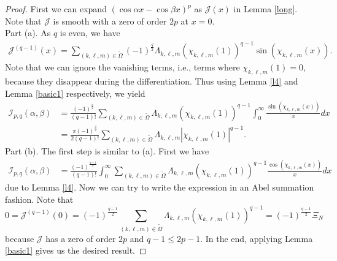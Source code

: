 \documentclass[12pt, reqno]{amsart}
\theoremstyle{plain}
\theoremstyle{definition}
\begin{document}
\begin{proof}
    First we can expand $(\cos \alpha x-\cos\beta x)^p$ as $\mathcal{J}(x)$ in Lemma \ref{long}. Note that $\mathcal{J}$ is smooth with a zero of order $2p$ at $x=0$.\\
    Part (a). As $q$ is even, we have
    \begin{align*}
        \mathcal{J}^{(q-1)}(x)=\sum_{(k, \ell, m)\in\tilde{\Omega}}(-1)^{\frac{q}{2}}\Lambda_{k, \ell, m}(\chi_{k, \ell, m}(1))^{q-1}\sin(\chi_{k, \ell, m}(x)).
    \end{align*}
    Note that we can ignore the vanishing terms, i.e., terms where $\chi_{k, \ell, m}(1)=0$, because they disappear during the differentiation. Thus using Lemma \ref{l4} and Lemma \ref{basic1} respectively, we yield
    \begin{align*}
       \mathcal{I}_{p, q}(\alpha, \beta)&=\frac{(-1)^{\frac{q}{2}}}{(q-1)!}\sum_{(k, \ell, m)\in\tilde{\Omega}}\Lambda_{k, \ell, m}(\chi_{k, \ell, m}(1))^{q-1}\int_0^{\infty}\frac{\sin(\chi_{k, \ell, m}(x))}{x}dx\\
       &=\frac{\pi(-1)^{\frac{q}{2}}}{2(q-1)!}\sum_{(k, \ell, m)\in\tilde{\Omega}}\Lambda_{k, \ell, m}|\chi_{k, \ell, m}(1)|^{q-1}.
    \end{align*}
    Part (b). The first step is similar to (a). First we have
    \begin{align*}%
    \mathcal{I}_{p, q}(\alpha, \beta) &=\frac{(-1)^{\frac{q-1}{2}}}{(q-1)!}\int_0^{\infty}\sum_{(k, \ell, m)\in\tilde{\Omega}}\Lambda_{k, \ell, m}(\chi_{k, \ell, m}(1))^{q-1}\frac{\cos(\chi_{k, \ell, m}(x))}{x}dx
    \end{align*}
    due to Lemma \ref{l4}.
    Now we can try to write the expression in an Abel summation fashion.  Note that \[0=\mathcal{J}^{(q-1)}(0)=(-1)^{\frac{q-1}{2}}\sum_{(k, \ell, m)\in\tilde{\Omega}}\Lambda_{k, \ell, m}(\chi_{k, \ell, m}(1))^{q-1}=(-1)^{\frac{q-1}{2}}\Xi_{N}\] because $\mathcal{J}$ has a zero of order $2p$ and $q-1\le 2p-1$. In the end, applying Lemma \ref{basic1} gives us the desired result.
\end{proof}
\end{document}
